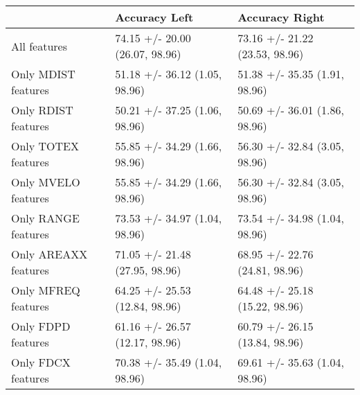 \begin{tabular}{lll}
\toprule
{} &                   Accuracy Left &                  Accuracy Right \\
\midrule
All features         &  74.15 +/- 20.00 (26.07, 98.96) &  73.16 +/- 21.22 (23.53, 98.96) \\
Only MDIST features  &   51.18 +/- 36.12 (1.05, 98.96) &   51.38 +/- 35.35 (1.91, 98.96) \\
Only RDIST features  &   50.21 +/- 37.25 (1.06, 98.96) &   50.69 +/- 36.01 (1.86, 98.96) \\
Only TOTEX features  &   55.85 +/- 34.29 (1.66, 98.96) &   56.30 +/- 32.84 (3.05, 98.96) \\
Only MVELO features  &   55.85 +/- 34.29 (1.66, 98.96) &   56.30 +/- 32.84 (3.05, 98.96) \\
Only RANGE features  &   73.53 +/- 34.97 (1.04, 98.96) &   73.54 +/- 34.98 (1.04, 98.96) \\
Only AREAXX features &  71.05 +/- 21.48 (27.95, 98.96) &  68.95 +/- 22.76 (24.81, 98.96) \\
Only MFREQ features  &  64.25 +/- 25.53 (12.84, 98.96) &  64.48 +/- 25.18 (15.22, 98.96) \\
Only FDPD features   &  61.16 +/- 26.57 (12.17, 98.96) &  60.79 +/- 26.15 (13.84, 98.96) \\
Only FDCX features   &   70.38 +/- 35.49 (1.04, 98.96) &   69.61 +/- 35.63 (1.04, 98.96) \\
\bottomrule
\end{tabular}
